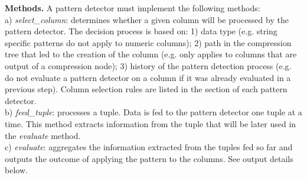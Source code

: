 \textbf{Methods.} A pattern detector must implement the following methods:\\
a) \textit{select\_column}: determines whether a given column will be processed by the pattern detector. The decision process is based on: 1) data type (e.g. string specific patterns do not apply to numeric columns); 2) path in the compression tree that led to the creation of the column (e.g.  only applies to columns that are output of a  compression node); 3) history of the pattern detection process (e.g. do not evaluate a pattern detector on a column if it was already evaluated in a previous step). Column selection rules are listed in the section of each pattern detector.\\
b) \textit{feed\_tuple}: processes a tuple. Data is fed to the pattern detector one tuple at a time. This method extracts information from the tuple that will be later used in the \textit{evaluate} method.\\
c) \textit{evaluate}: aggregates the information extracted from the tuples fed so far and outputs the outcome of applying the pattern to the columns. See output details below.

